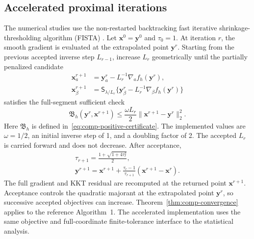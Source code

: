 \subsection{Accelerated proximal iterations}
\label{subsec:accelerated-implementation}
The numerical studies use the non-restarted backtracking fast iterative shrinkage-thresholding algorithm (FISTA) \citep{BeckTeboulle2009}. Let $\bm{x}^0=\bm{y}^0$ and $\tau_0=1$. At iteration $r$, the smooth gradient is evaluated at the extrapolated point $\bm{y}^r$. Starting from the previous accepted inverse step $L_{r-1}$, increase $L_r$ geometrically until the partially penalized candidate
\begin{equation}
 \begin{aligned}
 \bm{x}^{r+1}_a&=\bm{y}^r_a-L_r^{-1}\nabla_a f_h(\bm{y}^r),\\
 \bm{x}^{r+1}_\beta&=\mathsf S_{\lambda/L_r}
       \{\bm{y}^r_\beta-L_r^{-1}\nabla_\beta f_h(\bm{y}^r)\}
 \end{aligned}
 \label{eq:integrated-fista-prox}
\end{equation}
satisfies the full-segment sufficient check
\begin{equation}
 \mathfrak B_h(\bm{y}^r,\bm{x}^{r+1})
       \le\frac{\omega L_r}{2}\|\bm{x}^{r+1}-\bm{y}^r\|_2^2.
 \label{eq:integrated-fista-accept}
\end{equation}
Here $\mathfrak B_h$ is defined in~\eqref{eq:comp-positive-certificate}. The implemented values are $\omega=1/2$, an initial inverse step of 1, and a doubling factor of 2. The accepted $L_r$ is carried forward and does not decrease. After acceptance,
\begin{equation}
 \begin{gathered}
\tau_{r+1}=\frac{1+\sqrt{1+4\tau_r^2}}2,\\
 \bm{y}^{r+1}=\bm{x}^{r+1}+
       \frac{\tau_r-1}{\tau_{r+1}}(\bm{x}^{r+1}-\bm{x}^r).
 \end{gathered}
 \label{eq:integrated-fista-momentum}
\end{equation}
The full gradient and KKT residual are recomputed at the returned point $\bm{x}^{r+1}$. Acceptance controls the quadratic majorant at the extrapolated point $\bm{y}^r$, so successive accepted objectives can increase. Theorem~\ref{thm:comp-convergence} applies to the reference Algorithm~1. The accelerated implementation uses the same objective and full-coordinate finite-tolerance interface to the statistical analysis.

